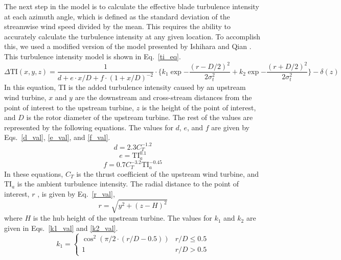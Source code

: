 \documentclass[11pt,letterpaper]{article}
\begin{document}
The next step in the model is to calculate the effective blade turbulence intensity at each azimuth angle, which is defined as the standard deviation of the streamwise wind speed divided by the mean. This requires the ability to accurately calculate the turbulence intensity at any given location. To accomplish this, we used a modified version of the model presented by Ishihara and Qian \cite{ishihara2018new}. This turbulence intensity model is shown in Eq.~\ref{ti_eq}.
%
\begin{equation}
    \label{ti_eq}
    \Delta \text{TI}(x,y,z) = \frac{1}{d + e \cdot x/D + f\cdot(1+x/D)^{-2}} \cdot \Big\{k_1 \exp{-\frac{(r-D/2)^2}{2\sigma_t^2}} + k_2 \exp{-\frac{(r+D/2)^2}{2\sigma_t^2}} \Big\} - \delta(z)
\end{equation}
% 
In this equation, $\text{TI}$ is the added turbulence intensity caused by an upstream wind turbine, $x$ and $y$ are the downstream and cross-stream distances from the point of interest to the upstream turbine, $z$ is the height of the point of interest, and $D$ is the rotor diameter of the upstream turbine. The rest of the values are represented by the following equations. The values for $d$, $e$, and $f$ are given by Eqs.~\ref{d_val}, \ref{e_val}, and \ref{f_val}.
%
\begin{equation}
    \label{d_val}
    d = 2.3C_T^{-1.2}
\end{equation}
%
\begin{equation}
    \label{e_val}
    e = \text{TI}_a^{0.1}
\end{equation}
%
\begin{equation}
    \label{f_val}
    f = 0.7C_T^{-3.2} \text{TI}_a^{-0.45}
\end{equation}
In these equations, $C_T$ is the thrust coefficient of the upstream wind turbine, and $\text{TI}_a$ is the ambient turbulence intensity. The radial distance to the point of interest, $r$ , is given by Eq.~\ref{r_val},
%
\begin{equation}
    \label{r_val}
    r = \sqrt{y^2 + (z-H)^2}
\end{equation}
where $H$ is the hub height of the upstream turbine. The values for $k_1$ and $k_2$ are given in Eqs.~\ref{k1_val} and \ref{k2_val}.
%
\begin{equation}
    \label{k1_val}
    k_1 = \begin{cases} 
      \cos^2{(\pi/2 \cdot (r/D - 0.5))} & r/D \leq 0.5 \\
      1 & r/D > 0.5
   \end{cases}
\end{equation}
\end{document}
